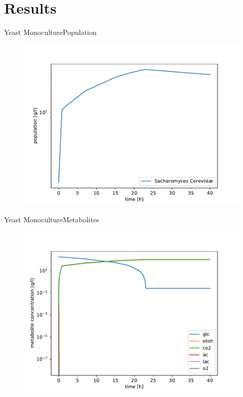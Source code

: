 \documentclass{beamer}
\begin{document}
\section{Results}

\begin{frame}{Yeast Monoculture}{Population}
	\begin{figure}
		\includegraphics[width=0.9\linewidth]{Img/Results/yeast/0lac_populations.pdf}
	\end{figure}
\end{frame}

\begin{frame}{Yeast Monoculture}{Metabolites}
	\begin{figure}
		\includegraphics[width=0.9\linewidth]{Img/Results/yeast/0lac_metabolites.pdf}
	\end{figure}
\end{frame}
\end{document}
